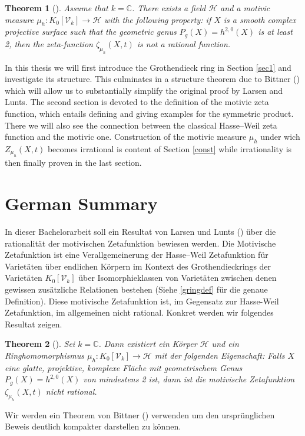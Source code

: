 \documentclass[11pt, a4paper, german]{article}
\theoremstyle{plain}
\newtheorem{theorem}{Theorem}[section]
\theoremstyle{definition}
\newcommand{\gring}[1][k]{K_0[\mathcal{V}_#1]}
\begin{document}
\begin{theorem}[{\cite[Thm. 1.6]{MR1996804}}]
\label{irrational}
Assume that $k = \mathbb{C}$. There exists a field $\mathcal{H}$ and a motivic measure $\mu_h \colon \gring \to \mathcal{H}$ with the following
property: if $X$ is a smooth complex projective surface such that the geometric genus $P_g(X)=h^{2,0}(X)$ is at least 2, 
then the zeta-function $\zeta_{\mu_h}(X,t)$ is not a rational function.
\end{theorem}

In this thesis we will first introduce the Grothendieck ring in Section \ref{sec1} and investigate its structure. 
This culminates in a structure theorem due to Bittner (\cite[Thm 3.1]{Bittner}) which will allow us to substantially simplify the original 
proof by Larsen and Lunts.
The second section is devoted to the definition of the motivic zeta function, which entails defining and giving examples for the symmetric 
product. There we will also see the connection between the classical Hasse--Weil zeta function and the motivic one.
Construction of the motivic measure $\mu_h$ under wich $Z_{\mu_h}(X,t)$ becomes irrational is content of Section \ref{const} while irrationality
is then finally proven in the last section.

\section{German Summary}
In dieser Bachelorarbeit soll ein Resultat von Larsen und Lunts (\cite{MR1996804}) über die rationalität der motivischen Zetafunktion
bewiesen werden. Die Motivische Zetafunktion ist eine Verallgemeinerung der Hasse--Weil Zetafunktion für Varietäten über endlichen Körpern
im Kontext des Grothendieckrings der Varietäten $\gring[k]$ über Isomorphieklassen von Varietäten zwischen denen gewissen zusätzliche 
Relationen bestehen (Siehe \ref{gringdef} für die genaue Definition). 
Diese motivische Zetafunktion ist, im Gegensatz zur Hasse-Weil Zetafunktion, im allgemeinen nicht rational. 
Konkret werden wir folgendes Resultat zeigen.
\begin{theorem}[{\cite[Thm. 1.6]{MR1996804}}]
Sei $k = \mathbb{C}$. Dann existiert ein Körper $\mathcal{H}$ und ein Ringhomomorphismus $\mu_h \colon \gring \to \mathcal{H}$ mit der folgenden
Eigenschaft: Falls $X$ eine glatte, projektive, komplexe Fläche mit geometrischem Genus $P_g(X) = h^{2,0}(X)$ von mindestens 2 ist, dann ist die
motivische Zetafunktion $\zeta_{\mu_h}(X,t)$ nicht rational.
\end{theorem}
Wir werden ein Theorem von Bittner (\cite{Bittner}) verwenden um den ursprünglichen Beweis deutlich kompakter darstellen zu können.
\end{document}
